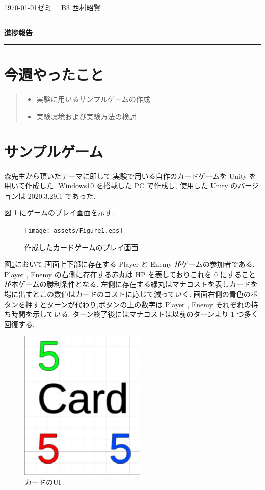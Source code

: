 \documentclass{jarticle}     %
\begin{document}
  \noindent
  \onecolumn
  \hspace{1em}

  \today ゼミ
  \hfill
  \ \  B3 西村昭賢 

  \vspace{2mm}
  \hrule
  \begin{center}
  {\Large \bf 進捗報告}
  \end{center}
  \hrule
  \vspace{3mm}


\section{今週やったこと}

\begin{quote}
  \begin{itemize}
   \item 実験に用いるサンプルゲームの作成
   \item 実験環境および実験方法の検討
  \end{itemize}
 \end{quote}

\section{サンプルゲーム}
森先生から頂いたテーマに即して,実験で用いる自作のカードゲームを Unity を用いて作成した.
Windows10 を搭載した PC で作成し, 使用した Unity のバージョンは 2020.3.29f1 であった.\par
図 1 にゲームのプレイ画面を示す.


\begin{figure}[H]
  \centering
  \texttt{[image: assets/Figure1.eps]}
  \caption{作成したカードゲームのプレイ画面}
  \label{fig:sample}
\end{figure}

図\ref{fig:sample}において,画面上下部に存在する Player と Enemy がゲームの参加者である.
 Player , Enemy の右側に存在する赤丸は HP を表しておりこれを 0 にすることが本ゲームの勝利条件となる.
 左側に存在する緑丸はマナコストを表しカードを場に出すとこの数値はカードのコストに応じて減っていく.
画面右側の青色のボタンを押すとターンが代わり,ボタンの上の数字は Player , Enemy それぞれの持ち時間を示している.
ターン終了後にはマナコストは以前のターンより 1 つ多く回復する.
\begin{figure}[htbp]
  \centering
  \includegraphics[width=60mm]{assets/Figure2.eps}
  \caption{カードのUI}
  \label{fig:card}
\end{figure}
\end{document}
